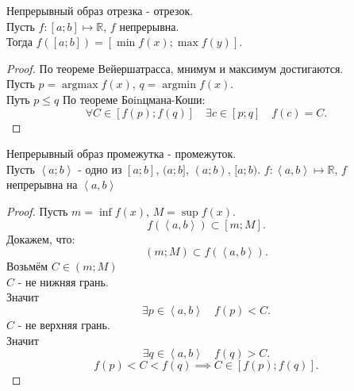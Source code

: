 \documentclass[11pt, oneside]{article}   	%
\DeclareMathOperator{\argmin}{argmax}
\DeclareMathOperator{\argmax}{argmin}
\begin{document}
    \begin{theorem}
        Непрерывный образ отрезка - отрезок.\\
        Пусть $f: \left[a; b\right] \mapsto \mathbb{R}$, $f$ непрерывна.\\
        Тогда $f(\left[a;b\right]) = \left[\min f(x); \max f(y)\right]$.
        \begin{proof}
            По теореме Вейершатрасса, мнимум и максимум достигаются.\\
            Пусть $p = \argmin f(x)$, $q = \argmax f(x)$.\\
            Путь $p\le q$
            По теореме Боinцмана-Коши:\\
            \[ \forall{C\in \left[f(p); f(q)\right]}\quad \exists{c\in \left[p; q\right]}\quad f(c) = C   .\] 
        \end{proof}
    \end{theorem}
    \begin{theorem}
        Непрерывный образ промежутка - промежуток.\\
        Пусть $ \left<a; b\right>$ - одно из $\left[a; b\right]$, $(a;b]$, $ \left( a; b \right) $, $[a; b)$.
        $f: \left<a, b\right> \mapsto \mathbb{R}$, $f$ непрерывна на $\left<a, b\right>$
        \begin{proof}
            Пусть $m =\inf f(x)$, $M = \sup f(x)$.\\
            \[ f(\left<a, b\right>) \subset \left[m; M\right] .\] 
            Докажем, что:
            \[ \left( m; M \right) \subset f(\left<a, b\right>) .\]
            Возьмём $C\in \left( m; M \right) $\\
            $C$ - не нижняя грань.\\
            Значит
            \[ \exists{p\in \left<a, b\right>}\quad f(p) < C  .\]
            $C$ - не верхняя грань.\\
            Значит
            \[ \exists{q\in \left<a, b\right>}\quad f(q) > C  .\]
            \[ f(p) < C < f(q) \implies C\in \left[f(p); f(q)\right] .\] 
        \end{proof}
    \end{theorem}
\end{document}
